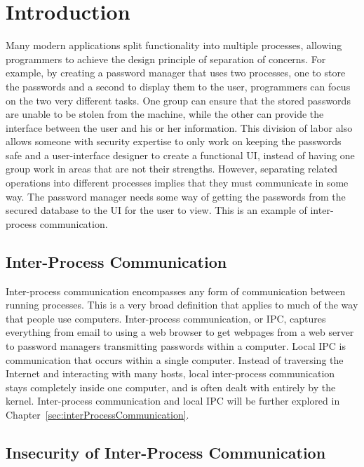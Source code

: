 \chapter{Introduction}
\label{sec:intro}

Many modern applications split functionality into multiple processes, allowing programmers to achieve the design principle of separation of concerns.  For example, by creating a password manager that uses two processes, one to store the passwords and a second to display them to the user, programmers can focus on the two very different tasks.  One group can ensure that the stored passwords are unable to be stolen from the machine, while the other can provide the interface between the user and his or her information.  This division of labor also allows someone with security expertise to only work on keeping the passwords safe and a user-interface designer to create a functional UI, instead of having one group work in areas that are not their strengths.  However, separating related operations into different processes implies that they must communicate in some way.  The password manager needs some way of getting the passwords from the secured database to the UI for the user to view.  This is an example of inter-process communication.

\section{Inter-Process Communication}
\label{sec:ipcIntro}
Inter-process communication encompasses any form of communication between running processes.  This is a very broad definition that applies to much of the way that people use computers.  Inter-process communication, or IPC, captures everything from email to using a web browser to get webpages from a web server to password managers transmitting passwords within a computer.  Local IPC is communication that occurs within a single computer.  Instead of traversing the Internet and interacting with many hosts, local inter-process communication stays completely inside one computer, and is often dealt with entirely by the kernel.  Inter-process communication and local IPC will be further explored in Chapter~\ref{sec:interProcessCommunication}.

\section{Insecurity of Inter-Process Communication}
\label{sec:ipcInsecurity}
